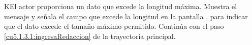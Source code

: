  \begin{UCtrayectoriaA}{K}{El actor proporciona un dato que excede la longitud máxima.}
    \UCpaso[\UCsist] Muestra el mensaje  y señala el campo que excede la 
    longitud en la pantalla , para indicar que el dato excede el tamaño máximo permitido.
    \UCpaso[] Continúa con el paso \ref{cu5.1.3.1:ingresaRedaccion} de la trayectoria principal.
 \end{UCtrayectoriaA}

  